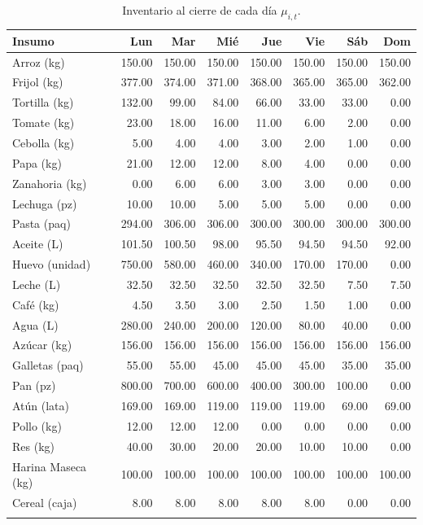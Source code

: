 \documentclass[12pt, a4paper]{article}
\begin{document}
\begin{longtable}{lrrrrrrr}
\toprule
\textbf{Insumo} & \textbf{Lun} & \textbf{Mar} & \textbf{Mié} & \textbf{Jue} & \textbf{Vie} & \textbf{Sáb} & \textbf{Dom} \\
\midrule
\endhead
\bottomrule
\endfoot
Arroz (kg)        & 150.00 & 150.00 & 150.00 & 150.00 & 150.00 & 150.00 & 150.00 \\
Frijol (kg)       & 377.00 & 374.00 & 371.00 & 368.00 & 365.00 & 365.00 & 362.00 \\
Tortilla (kg)     & 132.00 &  99.00 &  84.00 &  66.00 &  33.00 &  33.00 &   0.00 \\
Tomate (kg)       &  23.00 &  18.00 &  16.00 &  11.00 &   6.00 &   2.00 &   0.00 \\
Cebolla (kg)      &   5.00 &   4.00 &   4.00 &   3.00 &   2.00 &   1.00 &   0.00 \\
Papa (kg)         &  21.00 &  12.00 &  12.00 &   8.00 &   4.00 &   0.00 &   0.00 \\
Zanahoria (kg)    &   0.00 &   6.00 &   6.00 &   3.00 &   3.00 &   0.00 &   0.00 \\
Lechuga (pz)      &  10.00 &  10.00 &   5.00 &   5.00 &   5.00 &   0.00 &   0.00 \\
Pasta (paq)       & 294.00 & 306.00 & 306.00 & 300.00 & 300.00 & 300.00 & 300.00 \\
Aceite (L)        & 101.50 & 100.50 &  98.00 &  95.50 &  94.50 &  94.50 &  92.00 \\
Huevo (unidad)    & 750.00 & 580.00 & 460.00 & 340.00 & 170.00 & 170.00 &   0.00 \\
Leche (L)         &  32.50 &  32.50 &  32.50 &  32.50 &  32.50 &   7.50 &   7.50 \\
Café (kg)         &   4.50 &   3.50 &   3.00 &   2.50 &   1.50 &   1.00 &   0.00 \\
Agua (L)          & 280.00 & 240.00 & 200.00 & 120.00 &  80.00 &  40.00 &   0.00 \\
Azúcar (kg)       & 156.00 & 156.00 & 156.00 & 156.00 & 156.00 & 156.00 & 156.00 \\
Galletas (paq)    &  55.00 &  55.00 &  45.00 &  45.00 &  45.00 &  35.00 &  35.00 \\
Pan (pz)          & 800.00 & 700.00 & 600.00 & 400.00 & 300.00 & 100.00 &   0.00 \\
Atún (lata)       & 169.00 & 169.00 & 119.00 & 119.00 & 119.00 &  69.00 &  69.00 \\
Pollo (kg)        &  12.00 &  12.00 &  12.00 &   0.00 &   0.00 &   0.00 &   0.00 \\
Res (kg)          &  40.00 &  30.00 &  20.00 &  20.00 &  10.00 &  10.00 &   0.00 \\
Harina Maseca (kg)& 100.00 & 100.00 & 100.00 & 100.00 & 100.00 & 100.00 & 100.00 \\
Cereal (caja)     &   8.00 &   8.00 &   8.00 &   8.00 &   8.00 &   0.00 &   0.00 \\
\caption{Inventario al cierre de cada día $\mu_{i,t}$.}
\label{tab:inventario}
\end{longtable}
\end{document}
